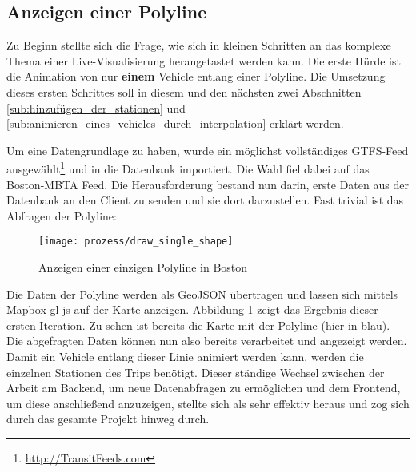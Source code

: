 \subsection{Anzeigen einer Polyline}
\label{sub:anzeigen_einer_polyline}
  Zu Beginn stellte sich die Frage, wie sich in kleinen Schritten an das komplexe Thema einer Live-Visualisierung herangetastet werden kann. Die erste Hürde ist die Animation von nur \textbf{einem} Vehicle entlang einer Polyline. Die Umsetzung dieses ersten Schrittes soll in diesem und den nächsten zwei Abschnitten \ref{sub:hinzufügen_der_stationen} und \ref{sub:animieren_eines_vehicles_durch_interpolation} erklärt werden.

  Um eine Datengrundlage zu haben, wurde ein möglichst vollständiges GTFS-Feed  ausgewählt\footnote{\url{http://TransitFeeds.com}} und in die Datenbank importiert. Die Wahl fiel dabei auf das Boston-MBTA Feed. Die Herausforderung bestand nun darin, erste Daten aus der Datenbank an den Client zu senden und sie dort darzustellen. Fast trivial ist das Abfragen der Polyline:

  \colorbox{lightGrey}{\texttt{}}

  \begin{figure}[htbp]
    \begin{center}
      \texttt{[image: prozess/draw\_single\_shape]}
      \caption{Anzeigen einer einzigen Polyline in Boston}
      \label{fig:prozess/draw_single_shape}
    \end{center}
  \end{figure}
  
  Die Daten der Polyline werden als GeoJSON übertragen und lassen sich mittels Mapbox-gl-js auf der Karte anzeigen. Abbildung \ref{fig:prozess/draw_single_shape} zeigt das Ergebnis dieser ersten Iteration. Zu sehen ist bereits die Karte mit der Polyline (hier in blau). Die abgefragten Daten können nun also bereits verarbeitet und angezeigt werden. Damit ein Vehicle entlang dieser Linie animiert werden kann, werden die einzelnen Stationen des Trips benötigt.
  Dieser ständige Wechsel zwischen der Arbeit am Backend, um neue Datenabfragen zu ermöglichen und dem Frontend, um diese anschließend anzuzeigen, stellte sich als sehr effektiv heraus und zog sich durch das gesamte Projekt hinweg durch.
